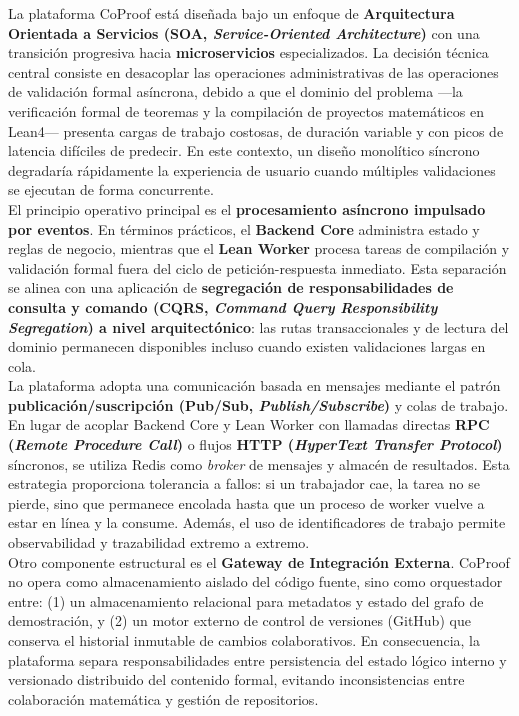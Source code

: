\documentclass[12pt, letterpaper]{article}
\begin{document}
La plataforma CoProof está diseñada bajo un enfoque de \textbf{Arquitectura Orientada a Servicios (SOA, \textit{Service-Oriented Architecture})} con una transición progresiva hacia \textbf{microservicios} especializados. La decisión técnica central consiste en desacoplar las operaciones administrativas de las operaciones de validación formal asíncrona, debido a que el dominio del problema ---la verificación formal de teoremas y la compilación de proyectos matemáticos en Lean4--- presenta cargas de trabajo costosas, de duración variable y con picos de latencia difíciles de predecir. En este contexto, un diseño monolítico síncrono degradaría rápidamente la experiencia de usuario cuando múltiples validaciones se ejecutan de forma concurrente.\\

El principio operativo principal es el \textbf{procesamiento asíncrono impulsado por eventos}. En términos prácticos, el \textbf{Backend Core} administra estado y reglas de negocio, mientras que el \textbf{Lean Worker} procesa tareas de compilación y validación formal fuera del ciclo de petición-respuesta inmediato. Esta separación se alinea con una aplicación de \textbf{segregación de responsabilidades de consulta y comando (CQRS, \textit{Command Query Responsibility Segregation}) a nivel arquitectónico}: las rutas transaccionales y de lectura del dominio permanecen disponibles incluso cuando existen validaciones largas en cola.\\

La plataforma adopta una comunicación basada en mensajes mediante el patrón \textbf{publicación/suscripción (Pub/Sub, \textit{Publish/Subscribe})} y colas de trabajo. En lugar de acoplar Backend Core y Lean Worker con llamadas directas \textbf{RPC (\textit{Remote Procedure Call})} o flujos \textbf{HTTP (\textit{HyperText Transfer Protocol})} síncronos, se utiliza Redis como \textit{broker} de mensajes y almacén de resultados. Esta estrategia proporciona tolerancia a fallos: si un trabajador cae, la tarea no se pierde, sino que permanece encolada hasta que un proceso de worker vuelve a estar en línea y la consume. Además, el uso de identificadores de trabajo permite observabilidad y trazabilidad extremo a extremo.\\

Otro componente estructural es el \textbf{Gateway de Integración Externa}. CoProof no opera como almacenamiento aislado del código fuente, sino como orquestador entre: (1) un almacenamiento relacional para metadatos y estado del grafo de demostración, y (2) un motor externo de control de versiones (GitHub) que conserva el historial inmutable de cambios colaborativos. En consecuencia, la plataforma separa responsabilidades entre persistencia del estado lógico interno y versionado distribuido del contenido formal, evitando inconsistencias entre colaboración matemática y gestión de repositorios.
\end{document}
